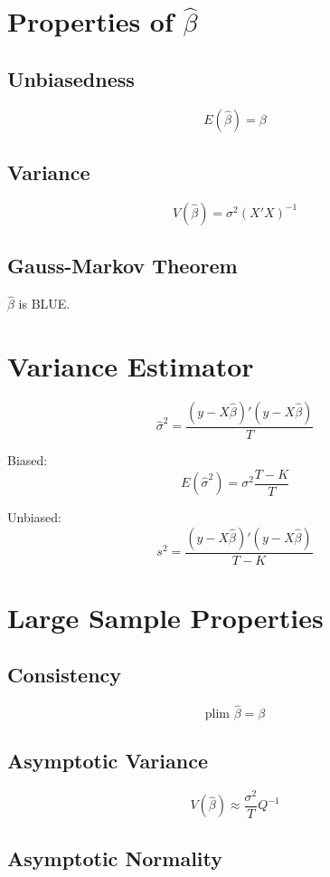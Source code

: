 \section{Properties of $\hat{\beta}$}

\subsection{Unbiasedness}

\[
E(\hat{\beta}) = \beta
\]

\subsection{Variance}

\[
V(\hat{\beta}) = \sigma^2 (X'X)^{-1}
\]

\subsection{Gauss-Markov Theorem}

$\hat{\beta}$ is BLUE.

\section{Variance Estimator}

\[
\hat{\sigma}^2 = \frac{(y-X\hat{\beta})'(y-X\hat{\beta})}{T}
\]

Biased:
\[
E(\hat{\sigma}^2) = \sigma^2 \frac{T-K}{T}
\]

Unbiased:
\[
s^2 = \frac{(y-X\hat{\beta})'(y-X\hat{\beta})}{T-K}
\]

\section{Large Sample Properties}

\subsection{Consistency}

\[
\text{plim } \hat{\beta} = \beta
\]

\subsection{Asymptotic Variance}

\[
V(\hat{\beta}) \approx \frac{\sigma^2}{T}Q^{-1}
\]

\subsection{Asymptotic Normality}

